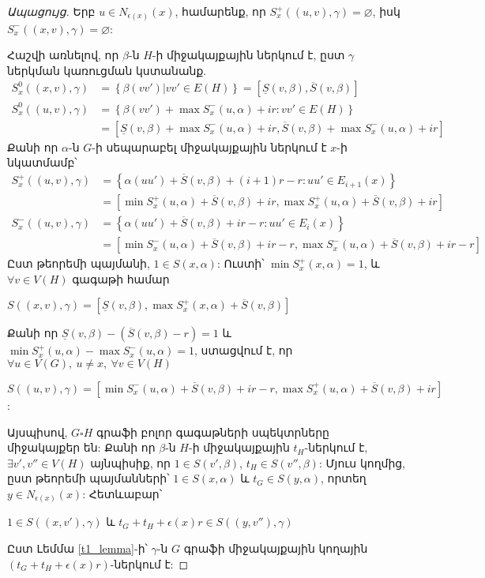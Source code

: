 \begin{proof}[Ապացույց]
Երբ $u\in N_{\epsilon(x)}(x)$, համարենք, որ $S_x^+((u,v),\gamma)=\varnothing$, իսկ $S_x^-((x,v),\gamma)=\varnothing$:

Հաշվի առնելով, որ $\beta$-ն $H$-ի միջակայքային ներկում է, ըստ $\gamma$ ներկման կառուցման կստանանք.
\begin{align*}
S_x^0((x,v),\gamma) &= \left\{ \beta(vv') | vv'\in E(H) \right\} = [\underline{S}(v,\beta),\overline{S}(v,\beta)]\\
S_x^0((u,v),\gamma) &= \left\{ \beta(vv') + \max{S_x^-(u,\alpha)} + i r : vv'\in E(H) \right\}\\
					&= [\underline{S}(v,\beta) + \max{S_x^-(u,\alpha)} + i r ,\overline{S}(v,\beta) + \max{S_x^-(u,\alpha)} + i r ]
\end{align*}
Քանի որ $\alpha$-ն $G$-ի սեպարաբել միջակայքային ներկում է $x$-ի նկատմամբ՝
\begin{align*}
S_x^+((u,v),\gamma) &= \left\{ \alpha(uu') + \overline{S}(v,\beta) + (i+1)r - r : uu'\in E_{i+1}(x) \right\}\\
					&= [\min{S_x^+(u,\alpha)} + \overline{S}(v,\beta) + i r,\max{S_x^+(u,\alpha)} + \overline{S}(v,\beta) + i r ]\\
S_x^-((u,v),\gamma) &= \left\{ \alpha(uu') + \overline{S}(v,\beta) + i r - r : uu'\in E_{i}(x) \right\}\\
					&= [\min{S_x^-(u,\alpha)} + \overline{S}(v,\beta) + i r - r,\max{S_x^-(u,\alpha)} + \overline{S}(v,\beta) + i r - r ]
\end{align*}
Ըստ թեորեմի պայմանի, $1 \in S(x,\alpha)$: Ուստի՝ $\min{S_x^+(x,\alpha)}=1$, և $\forall v \in V(H)$ գագաթի համար
\begin{center}
$S((x,v),\gamma) = [\underline{S}(v,\beta),\max{S_x^+(x,\alpha)} + \overline{S}(v,\beta)] $
\end{center}
Քանի որ $ \underline{S}(v,\beta) - (\overline{S}(v,\beta) - r) = 1 $ և $ \min{S_x^+(u,\alpha)} - \max{S_x^-(u,\alpha)} = 1$, ստացվում է, որ $\forall u \in V(G),\ u \not= x,\ \forall v \in V(H)$
\begin{center}
$S((u,v),\gamma) = [\min{S_x^-(u,\alpha)} + \overline{S}(v,\beta) + i r - r,\max{S_x^+(u,\alpha)} + \overline{S}(v,\beta) + i r] $:
\end{center}
Այսպիսով, $G\square H$ գրաֆի բոլոր գագաթների սպեկտրները միջակայքեր են: Քանի որ $\beta$-ն $H$-ի միջակայքային $t_H$-ներկում է, $\exists v',v'' \in V(H)$ այնպիսիք, որ $1 \in S(v',\beta)$, $t_H \in S(v'',\beta)$: Մյուս կողմից, ըստ թեորեմի պայմանների՝ $1 \in S(x,\alpha)$ և $t_G \in S(y,\alpha)$, որտեղ $y \in N_{\epsilon(x)}(x)$: Հետևաբար՝
\begin{center}
$1 \in S((x,v'),\gamma)$ և $t_G+t_H+\epsilon(x)r \in S((y,v''),\gamma)$
\end{center}
Ըստ Լեմմա \ref{t1_lemma}-ի՝ $\gamma$-ն $G$ գրաֆի միջակայքային կողային $(t_G+t_H+\epsilon(x)r)$-ներկում է:

\end{proof}

